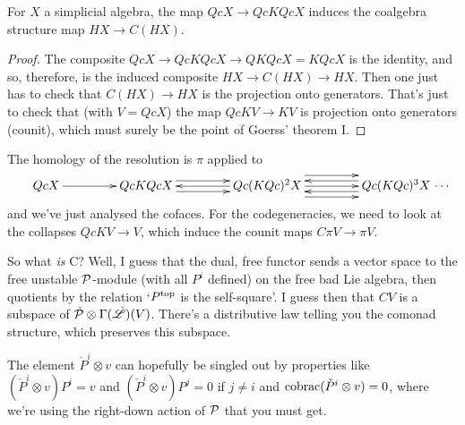 \documentclass[10pt]{article}
\begin{document}
\begin{Frontmatters}
\tableofcontents%
\end{Frontmatters}




\begin{cofreeFunctors}
\begin{lem}
For $X$ a simplicial algebra, the map $QcX\to QcKQcX$ induces the coalgebra structure map $HX\to C(HX)$.
\end{lem}
\begin{proof}
The composite $QcX\to QcKQcX\to QKQcX=KQcX$ is the identity, and so, therefore, is the induced composite $HX\to C(HX)\to HX$. Then one just has to check that $C(HX)\to HX$ is the projection onto generators. That's just to check that (with $V=QcX$) the map $QcKV\to KV$ is projection onto generators (counit), which must surely be the point of Goerss' theorem I.
\end{proof}

The homology of the resolution is $\pi$ applied to
\[
\vcenter{
\def\labelstyle{\scriptstyle}
\xymatrix@C=1.5cm@1{
QcX\,
\ar[r]
&
\,QcKQcX\,
\ar[r];[]
&
\,Qc(KQc)^2X\,
\ar@<-1ex>[l];[]
\ar@<+1ex>[l];[]
\ar@<+1ex>[r];[]
\ar@<-1ex>[r];[]
&
\,Qc(KQc)^3X\,\makebox[0cm][l]{\,$\cdots $}
\ar[l];[]
\ar@<-2ex>[l];[]
\ar@<+2ex>[l];[]
}}\]
and we've just analysed the cofaces. For the codegeneracies, we need to look at the collapses $QcK V\to V$, which induce the counit maps $C\pi V\to \pi V$.

So what \emph{is} C? Well, I guess that the dual, free functor sends a vector space to the free unstable $\mathcal{P}$-module (with all $P^i$ defined) on the free bad Lie algebra, then quotients by the relation `$P^\textup{top}$ is the self-square'. I guess then that $CV$ is a subspace of $\check{\mathcal{P}}\otimes\Gamma(\check{\mathscr{L}})(V)$. There's a distributive law telling you the comonad structure, which preserves this subspace.

The element $\check P^i\otimes v$ can hopefully be singled out by properties like $(\check P^i\otimes v)P^i=v$ and $(\check P^i\otimes v)P^j=0$ if $j\neq i$ and $\textup{cobrac}(\check P^i\otimes v)=0$, where we're using the right-down action of $\mathcal{P}$ that you must get.
\end{cofreeFunctors}
\end{document}
